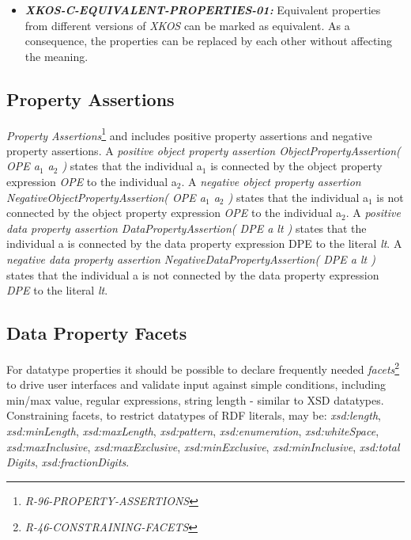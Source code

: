 \documentclass{llncs}
\begin{document}
\begin{itemize}
	\item \textbf{{\em XKOS-C-EQUIVALENT-PROPERTIES-01:}}
	Equivalent properties from different versions of \emph{XKOS} can be marked as equivalent. 
	As a consequence, the properties can be replaced by each other without affecting the meaning.
\end{itemize}

\subsection{Property Assertions}

\emph{{Property Assertions}}\footnote{\emph{R-96-PROPERTY-ASSERTIONS}}
and includes positive property assertions and negative property assertions.
A \emph{positive object property assertion ObjectPropertyAssertion( OPE a$_1$ a$_2$ )} states that the individual a$_1$ is connected by the object property expression \emph{OPE} to the individual a$_2$. 
A \emph{negative object property assertion NegativeObjectPropertyAssertion( OPE a$_1$ a$_2$ )} states that the individual a$_1$ is not connected by the object property expression \emph{OPE} to the individual a$_2$. 
A \emph{positive data property assertion DataPropertyAssertion( DPE a lt )} states that the individual a is connected by the data property expression DPE to the literal \emph{lt}. 
A \emph{negative data property assertion NegativeDataPropertyAssertion( DPE a lt )} states that the individual a is not connected by the data property expression \emph{DPE} to the literal \emph{lt}.

\subsection{Data Property Facets}

For datatype properties it should be possible to declare frequently needed \emph{facets}\footnote{\emph{R-46-CONSTRAINING-FACETS}} to drive user interfaces and validate input against simple conditions, including min/max value, regular expressions, string length - similar to XSD datatypes. 
Constraining facets, to restrict datatypes of RDF literals, may be: \emph{xsd:length}, \emph{xsd:minLength}, \emph{xsd:maxLength}, \emph{xsd:pattern}, \emph{xsd:enumeration}, \emph{xsd:whiteSpace}, \\ \emph{xsd:maxInclusive}, \emph{xsd:maxExclusive}, \emph{xsd:minExclusive}, \emph{xsd:minInclusive}, \emph{xsd:total} \emph{Digits}, \emph{xsd:fractionDigits}.
\end{document}
